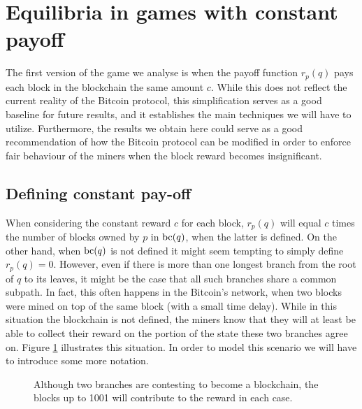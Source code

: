 

\section{Equilibria in games with constant payoff}
\label{sec-const_rew}

The first version of the game we analyse is when the payoff function $r_p(q)$ pays each block in the blockchain the same amount $c$. While this does not reflect the current reality of the Bitcoin protocol, this simplification serves as a good baseline for future results, and it establishes the main techniques we will have to utilize. Furthermore, the results we obtain here could serve as a good recommendation of how the Bitcoin protocol can be modified in order to enforce fair behaviour of the miners when the block reward becomes insignificant.

\subsection{Defining constant pay-off}
When considering the constant reward $c$ for each block, $r_p(q)$ will equal $c$ times the number of blocks owned by $p$ in $\text{bc}(q)$, when the latter is defined. On the other hand, when $\text{bc}(q)$ is not defined it might seem tempting to simply define $r_p(q) = 0$. However, even if there is more than one longest branch from the root of $q$ to its leaves, it might be the case that all such branches share a common subpath. In fact, this often happens in the Bitcoin's network, when two blocks were mined on top of the same block (with a small time delay). While in this situation the blockchain is not defined, the miners know that they will at least be able to collect their reward on the portion of the state these two branches agree on. Figure \ref{fig-simple-fork} illustrates this situation. In order to model this scenario we will have to introduce some more notation. 

\begin{figure}
\begin{center}
\end{center}
\label{fig-simple-fork}
\caption{Although two branches are contesting to become a blockchain, the blocks up to 1001 will contribute to the reward in each case.}
\end{figure}


